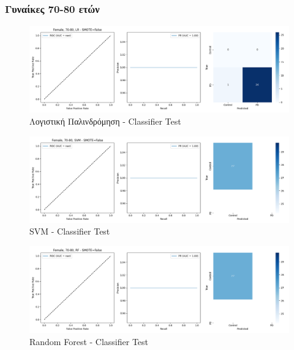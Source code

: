 \documentclass[12pt]{report}
\begin{document}
            \subsubsection*{Γυναίκες 70-80 ετών}
                \vspace{-0.5cm}
                \begin{figure}[H]
                    \centering
                    \includegraphics[width=1\textwidth]{ML/Predict/DEG/AUC/results_stratified_Female_70-80_LR_useSMOTE_False.png}
                    \caption*{Λογιστική Παλινδρόμηση - Classifier Test}
                    \label{fig:app_lr_females_70_80_test}
                \end{figure}
                \begin{figure}[H]
                    \centering
                    \includegraphics[width=1\textwidth]{ML/Predict/DEG/AUC/results_stratified_Female_70-80_SVM_useSMOTE_False.png}
                    \caption*{SVM - Classifier Test}
                    \label{fig:app_svm_females_70_80_test}
                \end{figure}
                \begin{figure}[H]
                    \centering
                    \includegraphics[width=1\textwidth]{ML/Predict/DEG/AUC/results_stratified_Female_70-80_RF_useSMOTE_False.png}
                    \caption*{Random Forest - Classifier Test}
                    \label{fig:app_rf_females_70_80_test}
                \end{figure}                
\end{document}

